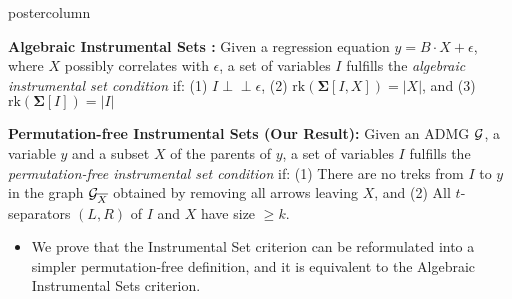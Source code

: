 \documentclass{beamer}
\def\ci{\perp\!\!\!\!\!\perp}
\begin{document}
\begin{frame}
\begin{columns}
\begin{column}{0.33\textwidth}
\begin{beamercolorbox}[center]{postercolumn}
\begin{minipage}{.98\textwidth}
{\begin{myblock}{}
		\vspace{0.5em}
		\textbf{Algebraic Instrumental Sets \citep{bollen2012instrumental}:}
			\justifying Given a regression equation $y = B \cdot X + \epsilon$, where $X$ possibly
			correlates with $\epsilon$, a set of variables
			$I$ fulfills the \emph{algebraic instrumental set condition} if: (1) $I \ci \epsilon$,
			(2) $\textrm{rk}(\bm{\Sigma}[I,X]) = |X|$, and (3) $\textrm{rk}(\bm{\Sigma}[I]) = |I|$

		\vspace{0.5em}
		\textbf{Permutation-free Instrumental Sets (Our Result):}
			\justifying Given an ADMG $\cal G$, a variable $y$ and a subset $X$ of the parents
			of $y$, a set of variables $I$ fulfills the \emph{permutation-free
			instrumental set condition} if: (1) There are no treks from $I$ to $y$
			in the graph ${\cal G}_{\overline{X}}$ obtained by removing all arrows
			leaving $X$, and (2) All $t$-separators $(L,R)$ of $I$ and $X$ have
			size $\geq k$.
		\vspace{0.5em}	
		\begin{itemize}
			\item \justifying We prove that the Instrumental Set
				criterion can be reformulated into a simpler
				permutation-free definition, and 
				it is equivalent to the Algebraic Instrumental Sets
				criterion.
		\end{itemize}


\end{myblock}}
\end{minipage}
\end{beamercolorbox}
\end{column}
\end{columns}
\end{frame}
\end{document}
